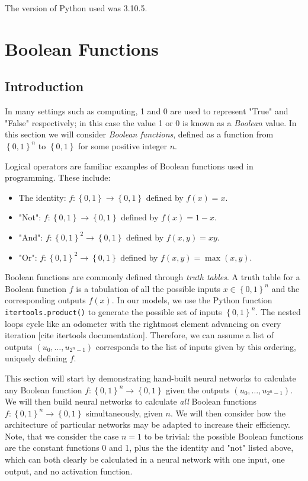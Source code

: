 \documentclass{somasmsc}
\begin{document}
The version of Python used was 3.10.5.

\chapter{Boolean Functions}\label{bool}

\section{Introduction}

In many settings such as computing, 1 and 0 are used to represent "True" and "False" respectively; in this case the value 1 or 0 is known as a \textit{Boolean} value. In this section we will consider \textit{Boolean functions}, defined as a function from $\left\{0, 1\right\}^n$ to $\left\{0, 1\right\}$ for some positive integer $n$.

Logical operators are familiar examples of Boolean functions used in programming. These include:
\begin{itemize}
    \item The identity: $f:\left\{0, 1\right\} \rightarrow \left\{0, 1\right\}$ defined by $f\left(x\right) = x$.
    \item "Not": $f:\left\{0, 1\right\} \rightarrow \left\{0, 1\right\}$ defined by $f\left(x\right) = 1-x$.
    \item "And": $f:\left\{0, 1\right\}^2 \rightarrow \left\{0, 1\right\}$ defined by $f\left(x,y\right) = xy$.
    \item "Or": $f:\left\{0, 1\right\}^2 \rightarrow \left\{0, 1\right\}$ defined by $f\left(x,y\right) = \max{\left(x, y\right)}$.
\end{itemize}

Boolean functions are commonly defined through \textit{truth tables}. A truth table for a Boolean function $f$ is a tabulation of all the possible inputs $x \in \left\{0, 1\right\}^n$ and the corresponding outputs $f\left(x\right)$. In our models, we use the Python function \verb|itertools.product()| to generate the possible set of inputs $\left\{0, 1\right\}^n$. The nested loops cycle like an odometer with the rightmost element advancing on every iteration [cite itertools documentation]. Therefore, we can assume a list of outputs $\left(u_0, \dots, u_{2^n-1}\right)$ corresponds to the list of inputs given by this ordering, uniquely defining $f$.

This section will start by demonstrating hand-built neural networks to calculate any Boolean function $f:\left\{0, 1\right\}^n \rightarrow \left\{0, 1\right\}$ given the outputs $\left(u_0, \dots, u_{2^n-1}\right)$. We will then build neural networks to calculate \textit{all} Boolean functions $f:\left\{0, 1\right\}^n \rightarrow \left\{0, 1\right\}$ simultaneously, given $n$. We will then consider how the architecture of particular networks may be adapted to increase their efficiency. Note, that we consider the case $n=1$ to be trivial: the possible Boolean functions are the constant functions 0 and 1, plus the the identity and "not" listed above, which can both clearly be calculated in a neural network with one input, one output, and no activation function.
\end{document}

